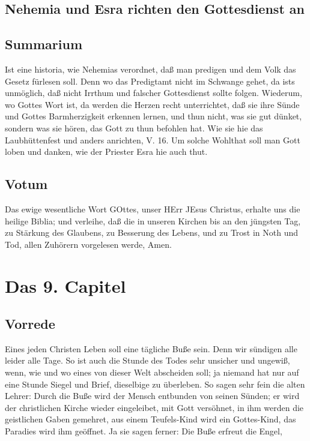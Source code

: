 \section{Nehemia und Esra richten den Gottesdienst an}


\section{Summarium}

Ist eine historia, wie Nehemias verordnet, daß man predigen und dem Volk das Gesetz fürlesen soll. Denn wo das Predigtamt nicht im Schwange gehet, da ists unmöglich, daß nicht Irrthum und falscher Gottesdienst sollte folgen. Wiederum, wo Gottes Wort ist, da werden die Herzen recht unterrichtet, daß sie ihre Sünde und Gottes Barmherzigkeit erkennen lernen, und thun nicht, was sie gut dünket, sondern was sie hören, das Gott zu thun befohlen hat. Wie sie hie das Laubhüttenfest und anders anrichten, V. 16. Um solche Wohlthat soll man Gott loben und danken, wie der Priester Esra hie auch thut.

\section{Votum}

Das ewige wesentliche Wort GOttes, unser HErr JEsus Christus, erhalte uns die heilige Biblia; und verleihe, daß die in unseren Kirchen bis an den jüngsten Tag, zu Stärkung des Glaubens, zu Besserung des Lebens, und zu Trost in Noth und Tod, allen Zuhörern vorgelesen werde, Amen.

\chapter{Das 9. Capitel}

\section{Vorrede}

Eines jeden Christen Leben soll eine tägliche Buße sein. Denn wir sündigen alle leider alle Tage. So ist auch die Stunde des Todes sehr unsicher und ungewiß, wenn, wie und wo eines von dieser Welt abscheiden soll; ja niemand hat nur auf eine Stunde Siegel und Brief, dieselbige zu überleben. So sagen sehr fein die alten Lehrer: Durch die Buße wird der Mensch entbunden von seinen Sünden; er wird der christlichen Kirche wieder eingeleibet, mit Gott versöhnet, in ihm werden die geistlichen Gaben gemehret, aus einem Teufels-Kind wird ein Gottes-Kind, das Paradies wird ihm geöffnet. Ja sie sagen ferner: Die Buße erfreut die Engel,

